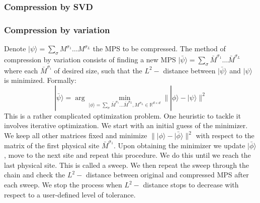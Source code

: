 \documentclass[english]{article}
\begin{document}
\subsubsection{Compression by SVD}
\subsubsection{Compression by variation}
Denote $|\psi\rangle=\sum_{\sigma}M^{\sigma_1}\dots M^{\sigma_L}$ the MPS to be compressed. The method of compression by variation consists of finding a new MPS $|\bar\psi\rangle=\sum_{\sigma}\bar M^{\sigma_1}\dots 
 \bar M^{\sigma_L}$ where each $\bar M^{\sigma_i}$ of desired size, such that the $L^2-$ distance between $|\bar\psi\rangle$ and $|\psi\rangle$ is minimized. Formally:
 \[
|\bar\psi\rangle = \arg\min_{|\phi\rangle=\sum_{\sigma}\bar M^{\sigma_1}\dots 
 \bar M^{\sigma_L}, M^{\sigma_L} \in \mathbb{R}^{d\times d} }\||\phi \rangle-|\psi\rangle\|^2
 \]
 This is a rather complicated optimization problem. One heuristic to tackle it involves iterative optimization. We start with an initial guess of the minimizer. We keep all other matrices fixed and minimize $\||\phi \rangle-|\bar\phi\rangle\|^2$ with respect to the matrix of the first physical site $\bar M^{\sigma_1}$. Upon obtaining the minimizer we update $|\bar\phi\rangle$, move to the next site and repeat this procedure. We do this until we reach the last physical site. This is called a sweep. We then repeat the sweep through the chain and check the $L^2-$ distance between original and compressed MPS after each sweep. We stop the process when $L^2-$ distance stops to decrease with respect to a user-defined level of tolerance.
\end{document}
